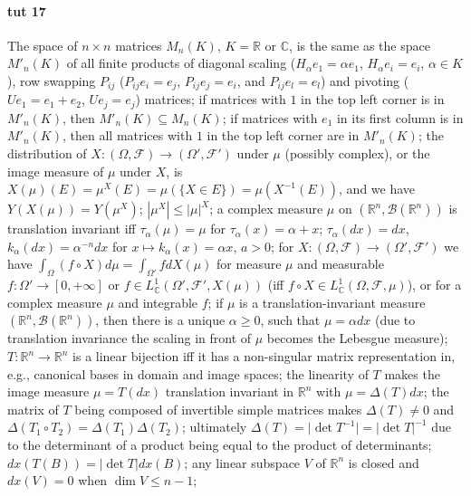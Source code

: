 \documentclass[a4paper]{article}
\newcommand{\Fcal}{\mathcal{F}}
\newcommand{\Bcal}{\mathcal{B}}
\newcommand{\real}{\mathbb{R}}
\newcommand{\cplx}{\mathbb{C}}
\begin{document}


\paragraph{tut 17} %
\label{par:tut_17}

The space of $n\times n$ matrices $M_n(K)$, $K = \real$ or $\cplx$, is the same as the space $M'_n(K)$ of all finite products of diagonal scaling ($H_\alpha e_1 = \alpha e_1$, $H_\alpha e_i = e_i$, $\alpha \in K$), row swapping $P_{ij}$ ($P_{ij} e_i = e_j$, $P_{ij} e_j = e_i$, and $P_{ij} e_l = e_l$) and pivoting ($U e_1 = e_1 + e_2$, $U e_j = e_j$) matrices;
if matrices with $1$ in the top left corner is in $M'_n(K)$, then $M'_n(K) \subseteq M_n(K)$;
if matrices with $e_1$ in its first column is in $M'_n(K)$, then all matrices with $1$ in the top left corner are in $M'_n(K)$;
the distribution of $X\colon (\Omega, \Fcal) \to (\Omega', \Fcal')$ under $\mu$ (possibly complex), or the image measure of $\mu$ under $X$, is $X(\mu)(E) = \mu^X(E) = \mu(\{X \in E\}) = \mu(X^{-1}(E))$, and we have $Y(X(\mu)) = Y(\mu^X)$;
$|\mu^X| \leq |\mu|^X$;
a complex measure $\mu$ on $(\real^n, \Bcal(\real^n))$ is translation invariant iff $\tau_\alpha(\mu) = \mu$ for $\tau_\alpha(x) = \alpha + x$;
$\tau_\alpha(dx) = dx$, $k_\alpha(dx) = \alpha^{-n} dx$ for $x\mapsto k_\alpha(x) = \alpha x$, $a > 0$;
for $X\colon (\Omega, \Fcal) \to (\Omega', \Fcal')$ we have $\int_{\Omega} (f \circ X) d\mu = \int_{\Omega'} f dX(\mu)$ for measure $\mu$ and measurable $f\colon \Omega' \to [0, +\infty]$ or $f\in L^1_\cplx(\Omega', \Fcal', X(\mu))$ (iff $f\circ X \in L^1_\cplx(\Omega, \Fcal, \mu)$), or for a complex measure $\mu$ and integrable $f$;
if $\mu$ is a translation-invariant measure $(\real^n, \Bcal(\real^n))$, then there is a unique $\alpha \geq 0$, such that $\mu = \alpha dx$ (due to translation invariance the scaling in front of $\mu$ becomes the Lebesgue measure);
$T\colon \real^n \to \real^n$ is a linear bijection iff it has a non-singular matrix representation in, e.g., canonical bases in domain and image spaces;
the linearity of $T$ makes the image measure $\mu = T(dx)$ translation invariant in $\real^n$ with $\mu = \Delta(T) dx$;
the matrix of $T$ being composed of invertible simple matrices makes $\Delta(T) \neq 0$ and $\Delta(T_1 \circ T_2) = \Delta(T_1) \Delta(T_2)$;
ultimately $\Delta(T) = \lvert \det T^{-1} \rvert = \lvert \det T \rvert^{-1}$ due to the determinant of a product being equal to the product of determinants;
$dx(T(B)) = \lvert \det T\rvert dx(B)$;
any linear subspace $V$ of $\real^n$ is closed and $dx(V) = 0$ when $\dim V \leq n-1$;
\end{document}
